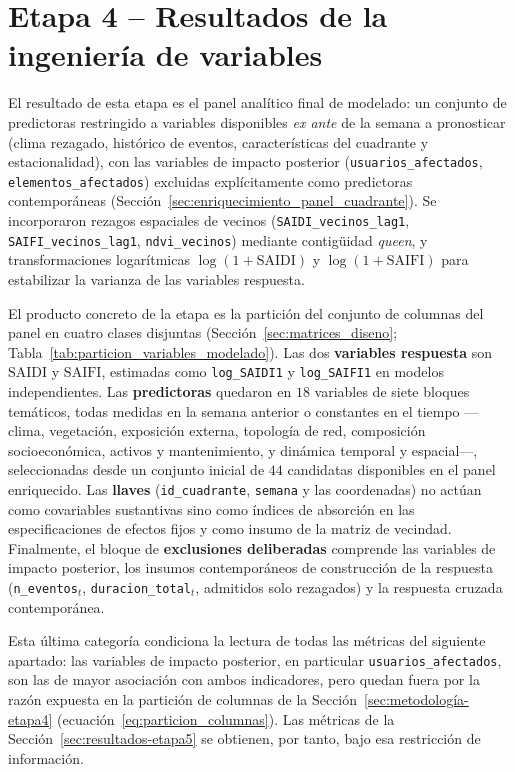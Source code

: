 \section{Etapa 4 – Resultados de la ingeniería de variables}
\label{sec:resultados-etapa4}

El resultado de esta etapa es el panel analítico final de modelado: un conjunto de predictoras restringido a variables disponibles \emph{ex ante} de la semana a pronosticar (clima rezagado, histórico de eventos, características del cuadrante y estacionalidad), con las variables de impacto posterior (\texttt{usuarios\_afectados}, \texttt{elementos\_afectados}) excluidas explícitamente como predictoras contemporáneas (Sección~\ref{sec:enriquecimiento_panel_cuadrante}). Se incorporaron rezagos espaciales de vecinos (\texttt{SAIDI\_vecinos\_lag1}, \texttt{SAIFI\_vecinos\_lag1}, \texttt{ndvi\_vecinos}) mediante contigüidad \emph{queen}, y transformaciones logarítmicas $\log(1+\mathrm{SAIDI})$ y $\log(1+\mathrm{SAIFI})$ para estabilizar la varianza de las variables respuesta.

El producto concreto de la etapa es la partición del conjunto de columnas del panel en cuatro clases disjuntas (Sección~\ref{sec:matrices_diseno}; Tabla~\ref{tab:particion_variables_modelado}). Las dos \textbf{variables respuesta} son $\mathrm{SAIDI}$ y $\mathrm{SAIFI}$, estimadas como \texttt{log\_SAIDI1} y \texttt{log\_SAIFI1} en modelos independientes. Las \textbf{predictoras} quedaron en $18$ variables de siete bloques temáticos, todas medidas en la semana anterior o constantes en el tiempo —clima, vegetación, exposición externa, topología de red, composición socioeconómica, activos y mantenimiento, y dinámica temporal y espacial—, seleccionadas desde un conjunto inicial de $44$ candidatas disponibles en el panel enriquecido. Las \textbf{llaves} (\texttt{id\_cuadrante}, \texttt{semana} y las coordenadas) no actúan como covariables sustantivas sino como índices de absorción en las especificaciones de efectos fijos y como insumo de la matriz de vecindad. Finalmente, el bloque de \textbf{exclusiones deliberadas} comprende las variables de impacto posterior, los insumos contemporáneos de construcción de la respuesta (\texttt{n\_eventos}$_t$, \texttt{duracion\_total}$_t$, admitidos solo rezagados) y la respuesta cruzada contemporánea.

Esta última categoría condiciona la lectura de todas las métricas del siguiente apartado: las variables de impacto posterior, en particular \texttt{usuarios\_afectados}, son las de mayor asociación con ambos indicadores, pero quedan fuera por la razón expuesta en la partición de columnas de la Sección~\ref{sec:metodología-etapa4} (ecuación~\eqref{eq:particion_columnas}). Las métricas de la Sección~\ref{sec:resultados-etapa5} se obtienen, por tanto, bajo esa restricción de información.

